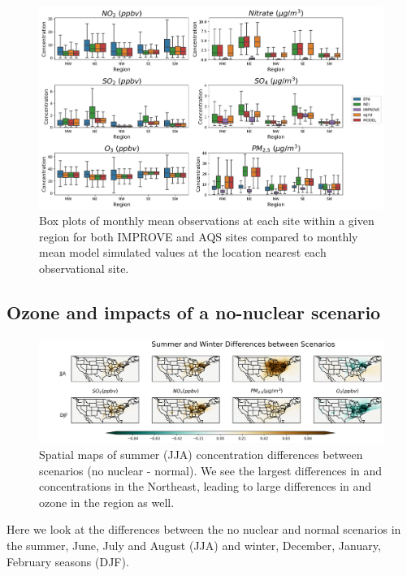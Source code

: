 \documentclass[12]{article}
\begin{document}
\begin{figure}
    \centering
    \includegraphics[scale=0.5]{model_validation/Figures/obs_boxplots.png}
    \caption{Box plots of monthly mean observations at each site within a given region for both IMPROVE and AQS sites compared to monthly mean model simulated values at the location nearest each observational site.} 
    \label{fig:obs_model}
\end{figure}


\subsection{Ozone and  impacts of a no-nuclear scenario}

\begin{figure}
    \centering
    \includegraphics[scale=0.5]{ego_nonuclear_project/Figures/summer_winter_national_dif.png}
    \caption{Spatial maps of summer (JJA) concentration differences between scenarios (no nuclear - normal). We see the largest differences in  and  concentrations in the Northeast, leading to large differences in  and ozone in the region as well.} 
    \label{fig:summer_winter_dif}
\end{figure}


Here we look at the differences between the no nuclear and normal scenarios in the summer, June, July and August (JJA) and winter, December, January, February seasons (DJF). 
\end{document}
